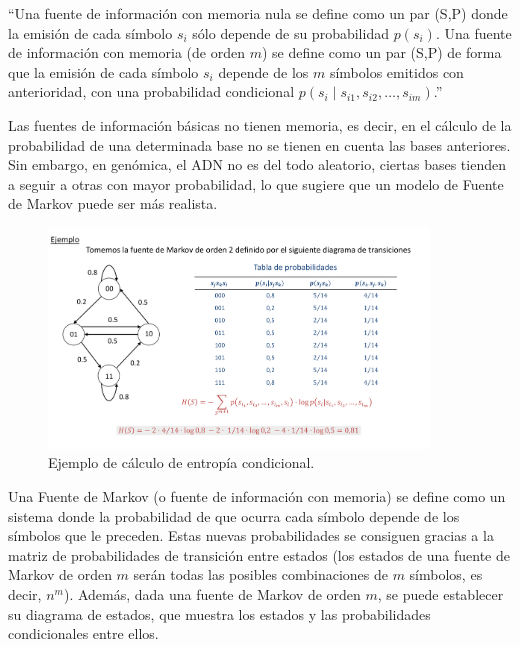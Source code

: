 \documentclass[11pt,spanish,listoffigures,listoftables]{tfgetsinf}
\begin{document}
“Una fuente de información con memoria nula se define como un par (S,P) donde la emisión de cada símbolo \( s_i \) sólo depende de su probabilidad \( p(s_i) \). Una fuente de información con memoria (de orden \( m \)) se define como un par (S,P) de forma que la emisión de cada símbolo \( s_i \) depende de los \( m \) símbolos emitidos con anterioridad, con una probabilidad condicional \( p(s_i \mid s_{i1}, s_{i2}, \dots, s_{im}) \).”\cite[p.~19]{ROB}

Las fuentes de información básicas no tienen memoria, es decir, en el cálculo de la probabilidad de una determinada base no se tienen en cuenta las bases anteriores. Sin embargo, en genómica, el \ac{ADN} no es del todo aleatorio, ciertas bases tienden a seguir a otras con mayor probabilidad, lo que sugiere que un modelo de Fuente de Markov puede ser más realista. 

\begin{figure}[H]
   \centering
   \includegraphics[width=0.9\textwidth]{entropia_markov.png}
   \caption{Ejemplo de cálculo de entropía condicional.}
   \label{fig:etiqueta_opcional}
\end{figure}


Una Fuente de Markov (o fuente de información con memoria) se define como un sistema donde la probabilidad de que ocurra cada símbolo depende de los símbolos que le preceden. Estas nuevas probabilidades se consiguen gracias a la matriz de probabilidades de transición entre estados (los estados de una fuente de Markov de orden \( m \) serán todas las posibles combinaciones de \( m \) símbolos, es decir, \( n^m \)). Además, dada una fuente de Markov de orden \( m \), se puede establecer su diagrama de estados, que muestra los estados y las probabilidades condicionales entre ellos\cite[p.~20]{ROB}.
\end{document}
